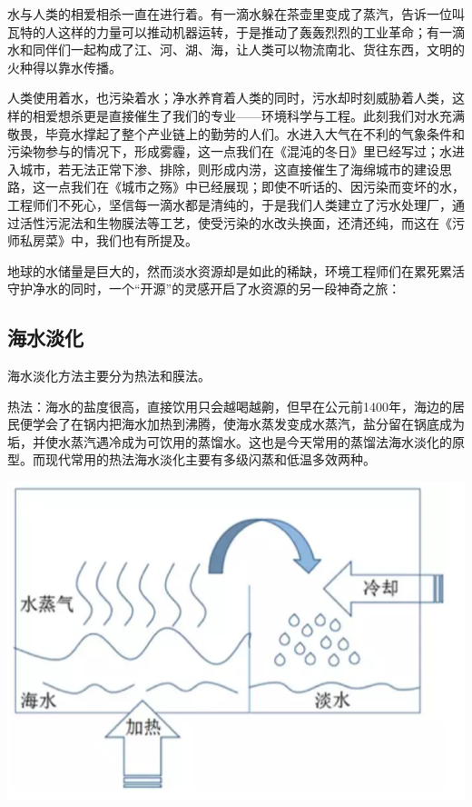 \documentclass[]{book}
\begin{document}
水与人类的相爱相杀一直在进行着。有一滴水躲在茶壶里变成了蒸汽，告诉一位叫瓦特的人这样的力量可以推动机器运转，于是推动了轰轰烈烈的工业革命；有一滴水和同伴们一起构成了江、河、湖、海，让人类可以物流南北、货往东西，文明的火种得以靠水传播。

人类使用着水，也污染着水；净水养育着人类的同时，污水却时刻威胁着人类，这样的相爱想杀更是直接催生了我们的专业------环境科学与工程。此刻我们对水充满敬畏，毕竟水撑起了整个产业链上的勤劳的人们。水进入大气在不利的气象条件和污染物参与的情况下，形成雾霾，这一点我们在《混沌的冬日》里已经写过；水进入城市，若无法正常下渗、排除，则形成内涝，这直接催生了海绵城市的建设思路，这一点我们在《城市之殇》中已经展现；即使不听话的、因污染而变坏的水，工程师们不死心，坚信每一滴水都是清纯的，于是我们人类建立了污水处理厂，通过活性污泥法和生物膜法等工艺，使受污染的水改头换面，还清还纯，而这在《污师私房菜》中，我们也有所提及。

地球的水储量是巨大的，然而淡水资源却是如此的稀缺，环境工程师们在累死累活守护净水的同时，一个``开源''的灵感开启了水资源的另一段神奇之旅：

\subsection{海水淡化}

海水淡化方法主要分为热法和膜法。

热法：海水的盐度很高，直接饮用只会越喝越齁，但早在公元前1400年，海边的居民便学会了在锅内把海水加热到沸腾，使海水蒸发变成水蒸汽，盐分留在锅底成为垢，并使水蒸汽遇冷成为可饮用的蒸馏水。这也是今天常用的蒸馏法海水淡化的原型。而现代常用的热法海水淡化主要有多级闪蒸和低温多效两种。

\includegraphics[width=8.33in]{images/seawater1}
\end{document}
